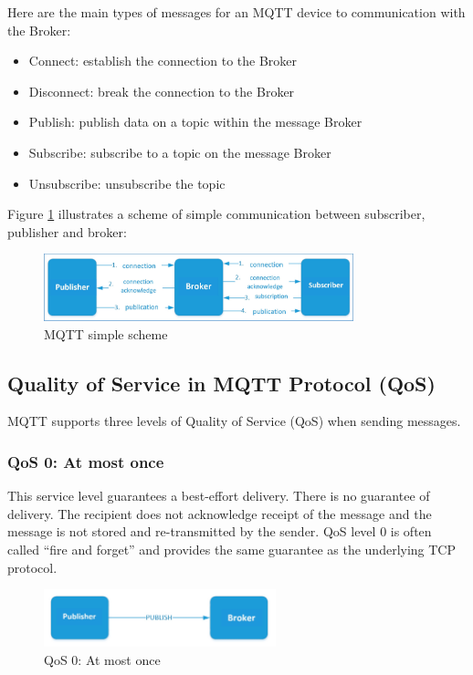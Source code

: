 \documentclass[\main/main.tex]{subfiles}
\begin{document}
Here are the main types of messages for an MQTT device to communication with the Broker:

\begin{itemize}
    \item Connect: establish the connection to the Broker
    \item Disconnect: break the connection to the Broker
    \item Publish: publish data on a topic within the message Broker
    \item Subscribe: subscribe to a topic on the message Broker
    \item Unsubscribe: unsubscribe the topic
\end{itemize}


Figure \ref{fig:mqtt_schema} illustrates a scheme of simple communication between subscriber, publisher and broker: 
\begin{figure}[H]
    \begin{center}
        \includegraphics[width=0.8\textwidth]{mqtt_schema.jpg}
    \end{center}
    \caption{MQTT simple scheme}
    \label{fig:mqtt_schema}
\end{figure}

\subsection{Quality of Service in MQTT Protocol (QoS) \cite{web_mqtt_ref}}

MQTT supports three levels of Quality of Service (QoS) when sending messages.

\subsubsection{QoS 0: At most once}
This service level guarantees a best-effort delivery. There is no guarantee of delivery. The recipient does not acknowledge receipt of the message and the message is not stored and re-transmitted by the sender. QoS level 0 is often called “fire and forget” and provides the same guarantee as the underlying TCP protocol.
\begin{figure}[H]
    \begin{center}
        \includegraphics[width=0.6\textwidth]{mqtt_qos_0.jpg}
    \end{center}
    \caption{QoS 0: At most once}
    \label{fig:mqtt_qos_0}
\end{figure}
\end{document}
